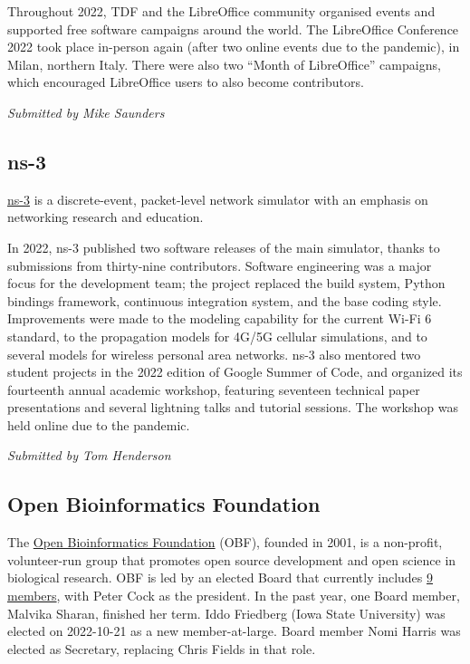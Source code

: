 \documentclass[a4paper]{report}
\begin{document}
Throughout 2022, TDF and the LibreOffice community organised events and supported free software campaigns around the world. The LibreOffice Conference 2022 took place in-person again (after two online events due to the pandemic), in Milan, northern Italy. There were also two ``Month of LibreOffice'' campaigns, which encouraged LibreOffice users to also become contributors.

{\em Submitted by Mike Saunders}

\subsection{ns-3}

\href{https://www.nsnam.org}{ns-3} is a discrete-event, packet-level network simulator with an emphasis on networking research and education.

In 2022, ns-3 published two software releases of the main simulator, thanks to submissions from thirty-nine contributors.  Software engineering was a major focus for the development team; the project replaced the build system, Python bindings framework, continuous integration system, and the base coding style.  Improvements were made to the modeling capability for the current Wi-Fi 6 standard, to the propagation models for 4G/5G cellular simulations, and to several models for wireless personal area networks.  ns-3 also mentored two student projects in the 2022 edition of Google Summer of Code, and organized its fourteenth annual academic workshop, featuring seventeen technical paper presentations and several lightning talks and tutorial sessions. The workshop was held online due to the pandemic.

{\em Submitted by Tom Henderson}

\subsection{Open Bioinformatics Foundation}

The \href{https://www.open-bio.org/}{Open Bioinformatics Foundation} (OBF), founded in 2001, is a non-profit, volunteer-run group that promotes open source development and open science in biological research. OBF is led by an elected Board that currently includes \href{https://open-bio.org/board/}{9 members}, with Peter Cock as the president. In the past year, one Board member, Malvika Sharan, finished her term. Iddo Friedberg (Iowa State University) was elected on 2022-10-21 as a new member-at-large.  Board member Nomi Harris was elected as Secretary, replacing Chris Fields in that role.
\end{document}
